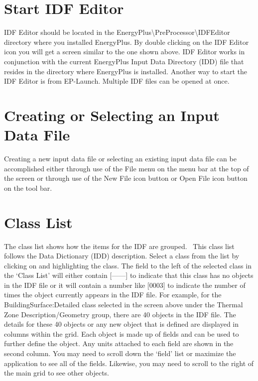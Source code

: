 \section{Start IDF Editor}\label{start-idf-editor}

IDF Editor should be located in the EnergyPlus\textbackslash{}PreProcessor\textbackslash{}IDFEditor directory where you installed EnergyPlus. By double clicking on the IDF Editor icon you will get a screen similar to the one shown above. IDF Editor works in conjunction with the current EnergyPlus Input Data Directory (IDD) file that resides in the directory where EnergyPlus is installed. Another way to start the IDF Editor is from EP-Launch. Multiple IDF files can be opened at once.

\section{Creating or Selecting an Input Data File}\label{creating-or-selecting-an-input-data-file}

Creating a new input data file or selecting an existing input data file can be accomplished either through use of the File menu on the menu bar at the top of the screen or through use of the New File icon button or Open File icon button on the tool bar.

\section{Class List}\label{class-list}

The class list shows how the items for the IDF are grouped.~ This class list follows the Data Dictionary (IDD) description. Select a class from the list by clicking on and highlighting the class. The field to the left of the selected class in the `Class List' will either contain {[}------{]} to indicate that this class has no objects in the IDF file or it will contain a number like {[}0003{]} to indicate the number of times the object currently appears in the IDF file. For example, for the BuildingSurface:Detailed class selected in the screen above under the Thermal Zone Description/Geometry group, there are 40 objects in the IDF file. The details for these 40 objects or any new object that is defined are displayed in columns within the grid. Each object is made up of fields and can be used to further define the object. Any units attached to each field are shown in the second column. You may need to scroll down the `field' list or maximize the application to see all of the fields. Likewise, you may need to scroll to the right of the main grid to see other objects.

